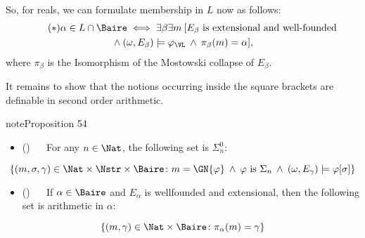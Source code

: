 \documentclass[letterpaper,10pt,english]{jupyterBook}
\begin{document}
\sphinxAtStartPar
So, for reals, we can formulate membership in \(L\) now as follows:
\begin{multline*} \tag{$*$}
	\alpha \in L \cap \Baire \iff \exists \beta \exists m \: [E_\beta \text{ is  extensional and well-founded} \\ \: \wedge \: (\omega,E_\beta) \models \varphi_{\VL} \: \wedge \: \pi_\beta(m) = \alpha ],
\end{multline*}
\sphinxAtStartPar
where \(\pi_\beta\) is the Isomorphism of the Mostowski collapse of \(E_\beta\).

\sphinxAtStartPar
It remains to show that the notions occurring inside the square brackets are definable in second order arithmetic.
\label{constructible-reals:prop-satisfaction-arithmetic}
\begin{sphinxadmonition}{note}{Proposition 54}


\begin{itemize}
\item {} 
\sphinxAtStartPar
() \(\quad\)  For any \(n \in \Nat\), the following set is \(\Sigma^0_n\):

\end{itemize}
\begin{equation*}
    \{(m,\sigma,\gamma) \in \Nat\times \Nstr\times \Baire \colon m = \GN{\varphi} \: \wedge \: \varphi \text{ is $\Sigma_n$} \: \wedge \: (\omega,E_\gamma) \models \varphi[\sigma] \}
\end{equation*}\begin{itemize}
\item {} 
\sphinxAtStartPar
() \(\quad\)  If \(\alpha \in \Baire\) and \(E_\alpha\) is well\sphinxhyphen{}founded and extensional, then the following set is arithmetic in \(\alpha\):

\end{itemize}
\begin{equation*}
	\{ (m,\gamma) \in \Nat\times \Baire \colon \pi_\alpha(m) = \gamma\}
\end{equation*}\end{sphinxadmonition}
\end{document}
